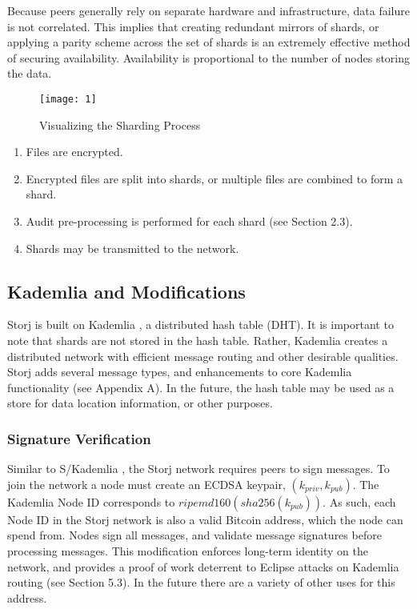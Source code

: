 \documentclass[a4paper,10pt]{article}
\begin{document}
Because peers generally rely on separate hardware and infrastructure, data failure is not correlated. This implies that creating redundant mirrors of shards, or applying a parity scheme across the set of shards is an extremely effective method of securing availability. Availability is proportional to the number of nodes storing the data.

\begin{figure}[hbt]
\centering
\texttt{[image: 1]}
\caption{Visualizing the Sharding Process}
\end{figure}

\begin{enumerate}
\item Files are encrypted.
\item Encrypted files are split into shards, or multiple files are combined to form a shard.
\item Audit pre-processing is performed for each shard (see Section 2.3).
\item Shards may be transmitted to the network.
\end{enumerate}

\subsection{Kademlia and Modifications}
Storj is built on Kademlia \cite{2}, a distributed hash table (DHT). It is important to note that shards are not stored in the hash table. Rather, Kademlia creates a distributed network with efficient message routing and other desirable qualities. Storj adds several message types, and enhancements to core Kademlia functionality (see Appendix A). In the future, the hash table may be used as a store for data location information, or other purposes.

\subsubsection{Signature Verification}
Similar to S/Kademlia \cite{3}, the Storj network requires peers to sign messages. To join the network a node must create an ECDSA keypair, $ (k_{priv}, k_{pub}) $. The Kademlia Node ID corresponds to $ ripemd160(sha256(k_{pub})) $. As such, each Node ID in the Storj network is also a valid Bitcoin address, which the node can spend from. Nodes sign all messages, and validate message signatures before processing messages. This modification enforces long-term identity on the network, and provides a proof of work deterrent to Eclipse attacks on Kademlia routing (see Section 5.3). In the future there are a variety of other uses for this address.
\end{document}
